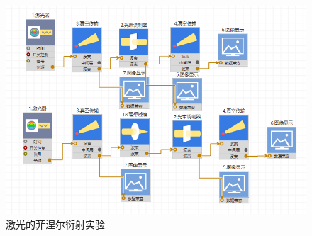 \documentclass[12pt,a4paper,UTF8]{ctexart}
\begin{document}

	\begin{figure}[htbp]
		\centering
		\includegraphics{img//2_2.png}
		\caption{激光的菲涅尔衍射实验}
	\end{figure}
\end{document}
